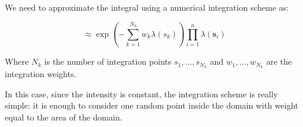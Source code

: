 \documentclass[
  letterpaper,
  DIV=11,
  numbers=noendperiod]{scrartcl}
\newenvironment{Shaded}{\begin{snugshade}}{\end{snugshade}}
\newcommand{\AttributeTok}[1]{\textcolor[rgb]{0.40,0.45,0.13}{#1}}
\newcommand{\CommentTok}[1]{\textcolor[rgb]{0.37,0.37,0.37}{#1}}
\newcommand{\DecValTok}[1]{\textcolor[rgb]{0.68,0.00,0.00}{#1}}
\newcommand{\ErrorTok}[1]{\textcolor[rgb]{0.68,0.00,0.00}{#1}}
\newcommand{\FunctionTok}[1]{\textcolor[rgb]{0.28,0.35,0.67}{#1}}
\newcommand{\NormalTok}[1]{\textcolor[rgb]{0.00,0.23,0.31}{#1}}
\newcommand{\OtherTok}[1]{\textcolor[rgb]{0.00,0.23,0.31}{#1}}
\newcommand{\SpecialCharTok}[1]{\textcolor[rgb]{0.37,0.37,0.37}{#1}}
\newcommand{\StringTok}[1]{\textcolor[rgb]{0.13,0.47,0.30}{#1}}
\begin{document}
We need to approximate the integral using a numerical integration scheme
as:

\[
\approx\exp\left(-\sum_{k=1}^{N_k}w_k\lambda(s_k)\right)\prod_{i=1}^n \lambda(\mathbf{s}_i)
\]

Where \(N_k\) is the number of integration points \(s_1,\dots,s_{N_k}\)
and \(w_1,\dots,w_{N_k}\) are the integration weights.

In this case, since the intensity is constant, the integration scheme is
really simple: it is enough to consider one random point inside the
domain with weight equal to the area of the domain.

\begin{Shaded}
\end{Shaded}
\end{document}
